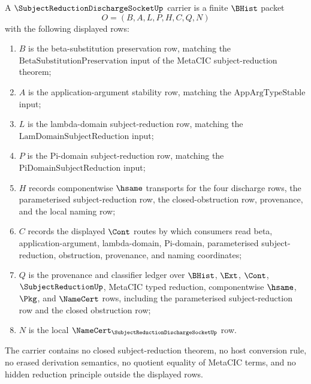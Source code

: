 \begin{definition}
\label{def:subject-reduction-discharge-socket-carrier}
A $\SubjectReductionDischargeSocketUp$ carrier is a finite $\BHist$ packet
$$
O=(B,A,L,P,H,C,Q,N)
$$
with the following displayed rows:
\begin{enumerate}
\item $B$ is the beta-substitution preservation row, matching the $\mathrm{BetaSubstitutionPreservation}$ input of the MetaCIC subject-reduction theorem;
\item $A$ is the application-argument stability row, matching the $\mathrm{AppArgTypeStable}$ input;
\item $L$ is the lambda-domain subject-reduction row, matching the $\mathrm{LamDomainSubjectReduction}$ input;
\item $P$ is the Pi-domain subject-reduction row, matching the $\mathrm{PiDomainSubjectReduction}$ input;
\item $H$ records componentwise $\hsame$ transports for the four discharge rows, the parameterised subject-reduction row, the closed-obstruction row, provenance, and the local naming row;
\item $C$ records the displayed $\Cont$ routes by which consumers read beta, application-argument, lambda-domain, Pi-domain, parameterised subject-reduction, obstruction, provenance, and naming coordinates;
\item $Q$ is the provenance and classifier ledger over $\BHist$, $\Ext$, $\Cont$, $\SubjectReductionUp$, MetaCIC typed reduction, componentwise $\hsame$, $\Pkg$, and $\NameCert$ rows, including the parameterised subject-reduction row and the closed obstruction row;
\item $N$ is the local $\NameCert_{\SubjectReductionDischargeSocketUp}$ row.
\end{enumerate}
The carrier contains no closed subject-reduction theorem, no host conversion rule, no erased derivation semantics, no quotient equality of MetaCIC terms, and no hidden reduction principle outside the displayed rows.
\end{definition}

